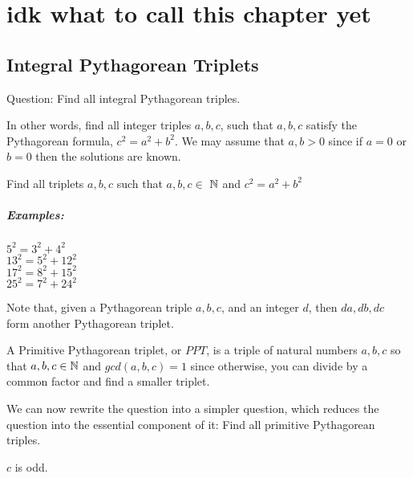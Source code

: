 \documentclass[main.tex]{subfiles}
\begin{document}
\chapter{idk what to call this chapter yet}

\section{Integral Pythagorean Triplets}
Question: Find all integral Pythagorean triples.

In other words, find all integer triples \(a, b, c\), such that \(a, b, c\) satisfy the Pythagorean formula,
\(c^2 = a^2 + b^2\). We may assume that \(a, b > 0\) since if \(a = 0\) or \(b = 0\) then the solutions are known.

Find all triplets \(a, b, c\) such that $a, b, c \in $ $\mathbb{N}$ and $c^2 = a^2 + b^2$

\paragraph{Examples:}
\begin{center}
    $5^2 = 3^2 + 4^2$ \\
    $13^2 = 5^2 + 12^2$ \\
    $17^2 = 8^2 + 15^2$ \\
    $25^2 = 7^2 + 24^2$
\end{center}
Note that, given a Pythagorean triple $a, b, c$, and an integer $d$, then $da, db, dc$ form another Pythagorean triplet.

\begin{defn}
    A Primitive Pythagorean triplet, or $PPT$, is a triple of natural numbers $a, b, c$ so that $a, b, c \in \mathbb{N}$ and $gcd(a, b, c) = 1$ since otherwise, you can divide by a common factor and find a smaller triplet.
\end{defn}

We can now rewrite the question into a simpler question, which reduces the question into the essential component of it: Find all primitive Pythagorean triples.

\begin{prop}
    $c$ is odd.
\end{prop}
\end{document}
